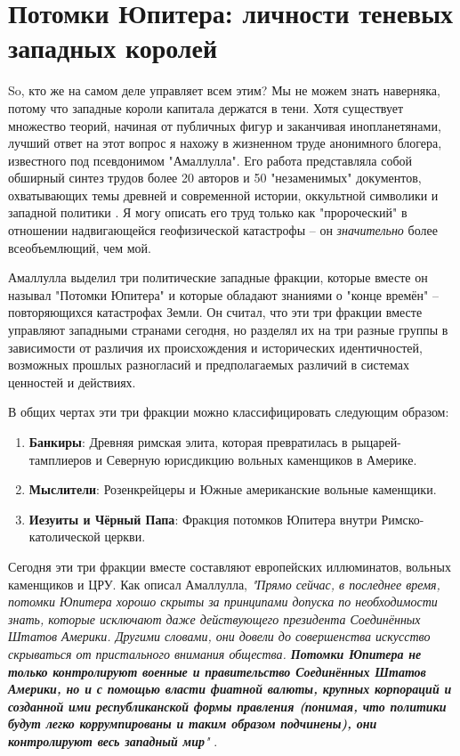 \documentclass[10pt,twocolumn,letterpaper]{article}
\begin{document}
\section{Потомки Юпитера: личности теневых западных королей}
So, кто же на самом деле управляет всем этим? Мы не можем знать наверняка, потому что западные короли капитала держатся в тени. Хотя существует множество теорий, начиная от публичных фигур и заканчивая инопланетянами, лучший ответ на этот вопрос я нахожу в жизненном труде анонимного блогера, известного под псевдонимом "Амаллулла". Его работа представляла собой обширный синтез трудов более 20 авторов и 50 "незаменимых" документов, охватывающих темы древней и современной истории, оккультной символики и западной политики \cite{33,34}. Я могу описать его труд только как "пророческий" в отношении надвигающейся геофизической катастрофы -- он \textit{значительно} более всеобъемлющий, чем мой.

Амаллулла выделил три политические западные фракции, которые вместе он называл "Потомки Юпитера" и которые обладают знаниями о "конце времён" -- повторяющихся катастрофах Земли. Он считал, что эти три фракции вместе управляют западными странами сегодня, но разделял их на три разные группы в зависимости от различия их происхождения и исторических идентичностей, возможных прошлых разногласий и предполагаемых различий в системах ценностей и действиях.

В общих чертах эти три фракции можно классифицировать следующим образом:

\begin{flushleft}
\begin{enumerate}
    \item \textbf{Банкиры}: Древняя римская элита, которая превратилась в рыцарей-тамплиеров и Северную юрисдикцию вольных каменщиков в Америке.
    \item \textbf{Мыслители}: Розенкрейцеры и Южные американские вольные каменщики.
    \item \textbf{Иезуиты и Чёрный Папа}: Фракция потомков Юпитера внутри Римско-католической церкви.
\end{enumerate}
\end{flushleft}

Сегодня эти три фракции вместе составляют европейских иллюминатов, вольных каменщиков и ЦРУ. Как описал Амаллулла, \textit{"Прямо сейчас, в последнее время, потомки Юпитера хорошо скрыты за принципами допуска по необходимости знать, которые исключают даже действующего президента Соединённых Штатов Америки. Другими словами, они довели до совершенства искусство скрываться от пристального внимания общества. \textbf{Потомки Юпитера не только контролируют военные и правительство Соединённых Штатов Америки, но и с помощью власти фиатной валюты, крупных корпораций и созданной ими республиканской формы правления (понимая, что политики будут легко коррумпированы и таким образом подчинены), они контролируют весь западный мир}"} \cite{33,34}.
\end{document}
